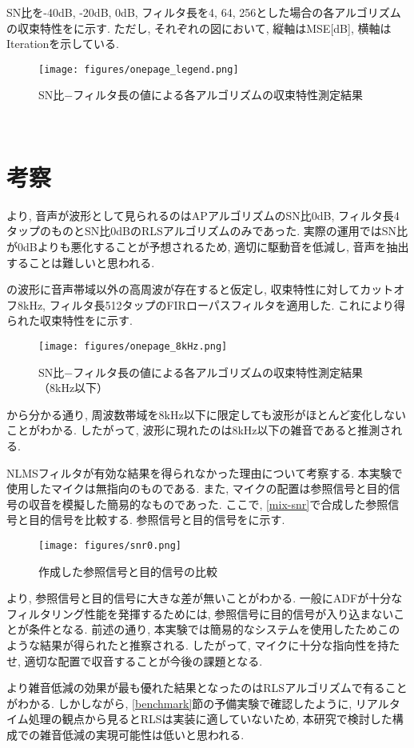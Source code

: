 SN比を-40dB, -20dB, 0dB, フィルタ長を4, 64, 256とした場合の各アルゴリズムの収束特性をに示す. ただし, それぞれの図において, 縦軸はMSE{[}dB{]}, 横軸はIterationを示している. 

\begin{figure}[H]
\centering
\texttt{[image: figures/onepage\_legend.png]}
\label{fig:onepage}
\caption{SN比−フィルタ長の値による各アルゴリズムの収束特性測定結果}
\end{figure}

\
\section{考察}\label{consideration-practice}

より, 音声が波形として見られるのはAPアルゴリズムのSN比0dB, フィルタ長4タップのものとSN比0dBのRLSアルゴリズムのみであった. 実際の運用ではSN比が0dBよりも悪化することが予想されるため, 適切に駆動音を低減し, 音声を抽出することは難しいと思われる. 

の波形に音声帯域以外の高周波が存在すると仮定し, 収束特性に対してカットオフ8kHz, フィルタ長512タップのFIRローパスフィルタを適用した. これにより得られた収束特性をに示す. 

\begin{figure}[H]
\centering
\texttt{[image: figures/onepage\_8kHz.png]}
\label{fig:onepage_8kHz}
\caption{SN比−フィルタ長の値による各アルゴリズムの収束特性測定結果（8kHz以下）}
\end{figure}

から分かる通り, 周波数帯域を8kHz以下に限定しても波形がほとんど変化しないことがわかる. したがって, 波形に現れたのは8kHz以下の雑音であると推測される. 

NLMSフィルタが有効な結果を得られなかった理由について考察する. 本実験で使用したマイクは無指向のものである. また, マイクの配置は参照信号と目的信号の収音を模擬した簡易的なものであった. ここで, \ref{mix-snr}で合成した参照信号と目的信号を比較する. 参照信号と目的信号をに示す. 

\begin{figure}[H]
\centering
\texttt{[image: figures/snr0.png]}
\caption{作成した参照信号と目的信号の比較}
\label{fig:compare_x_d}
\end{figure}

より, 参照信号と目的信号に大きな差が無いことがわかる. 一般にADFが十分なフィルタリング性能を発揮するためには, 参照信号に目的信号が入り込まないことが条件となる. 前述の通り, 本実験では簡易的なシステムを使用したためこのような結果が得られたと推察される. したがって, マイクに十分な指向性を持たせ, 適切な配置で収音することが今後の課題となる. 

より雑音低減の効果が最も優れた結果となったのはRLSアルゴリズムで有ることがわかる. しかしながら, \ref{benchmark}節の予備実験で確認したように, リアルタイム処理の観点から見るとRLSは実装に適していないため, 本研究で検討した構成での雑音低減の実現可能性は低いと思われる. 
